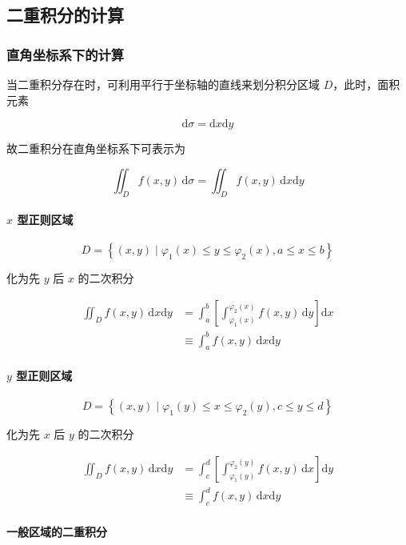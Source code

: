 \documentclass[lang = zh , final , oneside , openany , titlepage , zihao = -4 , linespread = 1.3 , baselineskip = false , cjk-font = windows , text-font = newtx , math-font = newtx]{sjtureport}
\begin{document}
\subsection{二重积分的计算}

\subsubsection{直角坐标系下的计算}

当二重积分存在时，可利用平行于坐标轴的直线来划分积分区域 \(D\)，此时，面积元素

\[
\mathrm{d}\sigma = \mathrm{d}x\mathrm{d}y
\]

故二重积分在直角坐标系下可表示为

\[
\iint_D f(x,y)\,\mathrm{d}\sigma = \iint_D f(x,y)\,\mathrm{d}x\mathrm{d}y
\]

\paragraph{\(x\) 型正则区域}

\[
D = \left\{(x,y)\mid \varphi_1(x)\leq y\leq \varphi_2(x),a\leq x\leq b\right\}
\]

化为先 \(y\) 后 \(x\) 的二次积分

\[
\begin{aligned}
    \iint_D f(x,y)\,\mathrm{d}x\mathrm{d}y &= \int_a^b\left[\int_{\varphi_1(x)}^{\varphi_2(x)} f(x,y)\,\mathrm{d}y\right]\mathrm{d}x \\
    &\equiv \int_a^b f(x,y)\,\mathrm{d}x\mathrm{d}y
\end{aligned}
\]

\paragraph{\(y\) 型正则区域}

\[
D = \left\{(x,y)\mid \varphi_1(y)\leq x\leq \varphi_2(y),c\leq y\leq d\right\}
\]

化为先 \(x\) 后 \(y\) 的二次积分

\[
\begin{aligned}
    \iint_D f(x,y)\,\mathrm{d}x\mathrm{d}y &= \int_c^d\left[\int_{\varphi_1(y)}^{\varphi_2(y)} f(x,y)\,\mathrm{d}x\right]\mathrm{d}y \\
    &\equiv \int_c^d f(x,y)\,\mathrm{d}x\mathrm{d}y
\end{aligned}
\]

\paragraph{一般区域的二重积分}
\end{document}
